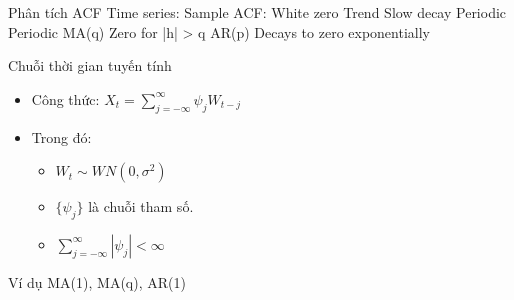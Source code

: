 Phân tích ACF
Time series: Sample ACF:
White zero
Trend Slow decay
Periodic Periodic
MA(q) Zero for |h| > q
AR(p) Decays to zero exponentially


\begin{block}{Chuỗi thời gian tuyến tính}
\begin{itemize}
\item Công thức: $X_t = \sum_{j = - \infty}^{\infty} \psi_j W_{t - j} $
\item Trong đó:
\begin{itemize}[label = $\diamond$]
\item ${W_t} \sim WN(0, \sigma^2)$
\item $ \{\psi_j\} $ là chuỗi tham số.
\item $\sum_{j = - \infty}^{\infty} |\psi_j| < \infty $
\end{itemize}
\end{itemize}
\end{block}

Ví dụ MA(1), MA(q), AR(1)
